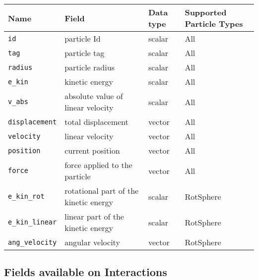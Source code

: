 \documentclass{manual}
\begin{document}
\begin{tabular}{|l|p{3.5cm}|l|p{2.5cm}|}
\hline
Name & Field & Data type & Supported Particle Types \\
\hline \hline
\verb{id{ & particle Id & scalar & All \\
\hline
\verb{tag{ & particle tag & scalar & All \\
\hline
\verb{radius{ & particle radius & scalar & All \\
\hline
\verb{e_kin{ & kinetic energy & scalar & All \\
\hline
\verb{v_abs{ & absolute value of linear velocity & scalar & All \\
\hline 
\verb{displacement{ & total displacement & vector & All \\
\hline
\verb{velocity{ & linear velocity & vector & All \\
\hline 
\verb{position{ & current position & vector & All \\
\hline 
\verb{force{ & force applied to the particle & vector & All \\
\hline
\hline
\verb{e_kin_rot{ & rotational part of the kinetic energy & scalar & RotSphere \\
\hline
\verb{e_kin_linear{ & linear part of the kinetic energy & scalar & RotSphere \\
\hline
\verb{ang_velocity{ & angular velocity & vector & RotSphere \\
\hline
\end{tabular}

\subsection{Fields available on Interactions}
\par \medskip
\end{document}
